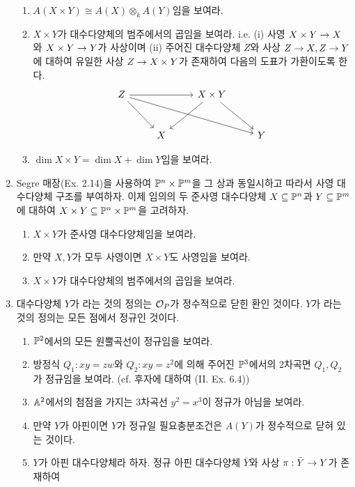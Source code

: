 \begin{enumerate}[label=\tb{3.\arabic*.},itemindent=0mm,itemsep=2mm]
\begin{enumerate}[label=(\alph*)]
	\item $A(X\times Y)\cong A(X)\otimes_kA(Y)$임을 보여라.
	\item $X\times Y$가 대수다양체의 범주에서의 곱임을 보여라. i.e. (i) 사영 $X\times Y\rightarrow X$와 $X\times Y\rightarrow Y$가 사상이며
	(ii) 주어진 대수다양체 $Z$와 사상 $Z\rightarrow X,Z\rightarrow Y$에 대하여 유일한 사상 $Z\rightarrow X\times Y$가 존재하여 다음의 도표가 가환이도록 한다.
	$$\begin{tikzcd}[row sep=large]Z\arrow[rr]\arrow[dr]\arrow[drrr]&&X\times Y\arrow[dl]\arrow[dr]\\&X&&Y\end{tikzcd}$$
	\item $\dim X\times Y=\dim X+\dim Y$임을 보여라.
	\end{enumerate}
	\item {} Segre 매장(Ex. 2.14)을 사용하여 $\mathbb{P}^n\times\mathbb{P}^m$을 그 상과 동일시하고
	따라서 사영 대수다양체 구조를 부여하자. 이제 임의의 두 준사영 대수다양체 $X\subseteq\mathbb{P}^n$과 $Y\subseteq\mathbb{P}^m$에 대하여
	$X\times Y\subseteq\mathbb{P}^n\times\mathbb{P}^m$을 고려하자.
	\begin{enumerate}[label=(\alph*)]
	\item $X\times Y$가 준사영 대수다양체임을 보여라.
	\item 만약 $X,Y$가 모두 사영이면 $X\times Y$도 사영임을 보여라.
	\end{enumerate}
	\begin{enumerate}[label=*(\alph*)]
	\setcounter{enumii}{2}
	\item $X\times Y$가 대수다양체의 범주에서의 곱임을 보여라.
	\end{enumerate}
	\item {} 대수다양체 $Y$가 라는 것의 정의는
	$\mathcal{O}_P$가 정수적으로 닫힌 환인 것이다. $Y$가 라는 것의 정의는 모든 점에서 정규인 것이다.
	\begin{enumerate}[label=(\alph*)]
	\item $\mathbb{P}^2$에서의 모든 원뿔곡선이 정규임을 보여라.
	\item 방정식 $Q_1:xy=zw$와 $Q_2:xy=z^2$에 의해 주어진 $\mathbb{P}^3$에서의 2차곡면 $Q_1,Q_2$가 정규임을 보여라.
	(cf. 후자에 대하여 (II. Ex. 6.4))
	\item $\mathbb{A}^2$에서의 첨점을 가지는 3차곡선 $y^2=x^3$이 정규가 아님을 보여라.
	\item 만약 $Y$가 아핀이면 $Y$가 정규일 필요충분조건은 $A(Y)$가 정수적으로 닫혀 있는 것이다.
	\item $Y$가 아핀 대수다양체라 하자. 정규 아핀 대수다양체 $\bar Y$와 사상 $\pi:\bar Y\rightarrow Y$가 존재하여

\end{enumerate}
\end{enumerate}
